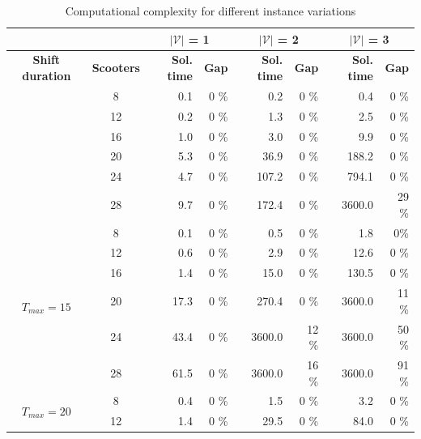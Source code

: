 \begin{table}
    \centering
    \caption{Computational complexity for different instance variations}
    \begingroup
        \setlength{\tabcolsep}{6pt} %
        \renewcommand{\arraystretch}{1.5} %
        \begin{tabular}{|c|c|r r|r r|r r|}
            \cline{3-8}
             \multicolumn{2}{c}{} \vline  & \multicolumn{2}{c}{$|\mathcal{V}|$ = 1} \vline & \multicolumn{2}{c}{$|\mathcal{V}|$ = 2} \vline  & \multicolumn{2}{c}{$|\mathcal{V}|$ = 3} \vline  \\ \hline
            \textbf{Shift duration} & \textbf{Scooters} & \textbf{Sol. time} & \textbf{Gap} & \textbf{Sol. time} & \textbf{Gap} & \textbf{Sol. time} & \textbf{Gap} \\ \thickhline
            \multirow{6}{*}{$T_{max} = 10$} & 8 & 0.1 & 0 \% & 0.2 & 0 \% & 0.4 & 0 \% \\ 
             & 12 & 0.2 & 0 \% & 1.3 & 0 \% & 2.5 & 0 \% \\ 
             & 16 & 1.0 & 0 \% & 3.0 & 0 \% & 9.9 & 0 \% \\ 
             & 20 & 5.3 & 0 \% & 36.9 & 0 \% & 188.2 & 0 \% \\ 
             & 24 & 4.7 & 0 \% & 107.2 & 0 \% & 794.1 & 0 \% \\ 
             & 28 & 9.7 & 0 \% & 172.4 & 0 \% & \cellcolor{red!20}3600.0 & \cellcolor{red!20}29 \% \\ \hline
            \multirow{6}{*}{$T_{max} = 15$} & 8 & 0.1 & 0 \% & 0.5 & 0 \% & 1.8 & 0\% \\ 
             & 12 & 0.6 & 0 \% & 2.9 & 0 \% & 12.6 & 0 \% \\ 
             & 16 & 1.4 & 0 \% & 15.0 & 0 \% & 130.5 & 0 \% \\ 
             & 20 & 17.3 & 0 \% & 270.4 & 0 \% &\cellcolor{red!20} 3600.0 &\cellcolor{red!20} 11 \% \\ 
             & 24 & 43.4 & 0 \% & \cellcolor{red!20}3600.0& \cellcolor{red!20}12 \% &\cellcolor{red!20} 3600.0 & \cellcolor{red!20}50 \% \\ 
             & 28 & 61.5 & 0 \% & \cellcolor{red!20}3600.0 & \cellcolor{red!20}16 \% &\cellcolor{red!20} 3600.0 &\cellcolor{red!20} 91 \% \\ \hline
            \multirow{6}{*}{$T_{max} = 20$} & 8 & 0.4 & 0 \% & 1.5 & 0 \% & 3.2 & 0 \% \\ 
             & 12 & 1.4 & 0 \% & 29.5 & 0 \% & 84.0 & 0 \% \\ 

\end{tabular}
\end{table}
